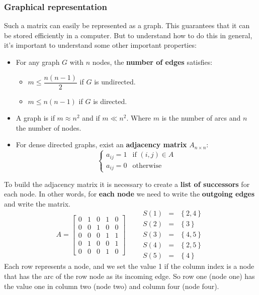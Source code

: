 \subsubsection{Graphical representation}

Such a matrix can easily be represented as a graph. This guarantees that it can be stored efficiently in a computer. But to understand how to do this in general, it's important to understand some other important properties:
\begin{itemize}
    \item For any graph $G$ with $n$ nodes, the \textbf{number of edges} satisfies:
    \begin{itemize}
        \item $m \le \dfrac{n\left(n-1\right)}{2}$ if $G$ is undirected.
        \item $m \le n\left(n-1\right)$ if $G$ is directed.
    \end{itemize}

    \item A graph is  if $m \approx n^{2}$ and  if $m \ll n^{2}$. Where $m$ is the number of arcs and $n$ the number of nodes.

    \item For dense directed graphs, exist an \textbf{adjacency matrix} $A_{n \times n}$:
    \begin{equation*}
        \begin{cases}
            a_{ij} = 1 & \text{if } \left(i,j\right) \in A \\
            a_{ij} = 0 & \text{otherwise}
        \end{cases}
    \end{equation*}
\end{itemize}
To build the adjacency matrix it is necessary to create a \textbf{list of successors} for each node. In other words, for \textbf{each node} we need to write the \textbf{outgoing edges} and write the matrix.
\begin{equation*}
    A = \begin{bmatrix}
        0 & 1 & 0 & 1 & 0 \\
        0 & 0 & 1 & 0 & 0 \\
        0 & 0 & 0 & 1 & 1 \\
        0 & 1 & 0 & 0 & 1 \\
        0 & 0 & 0 & 1 & 0
    \end{bmatrix}
    \hspace{2em}
    \begin{array}{rcl}
        S\left(1\right) &=& \left\{2,4\right\} \\
        S\left(2\right) &=& \left\{3\right\} \\
        S\left(3\right) &=& \left\{4,5\right\} \\
        S\left(4\right) &=& \left\{2,5\right\} \\
        S\left(5\right) &=& \left\{4\right\}
    \end{array}
\end{equation*}
Each row represents a node, and we set the value 1 if the column index is a node that has the arc of the row node as its incoming edge. So row one (node one) has the value one in column two (node two) and column four (node four).